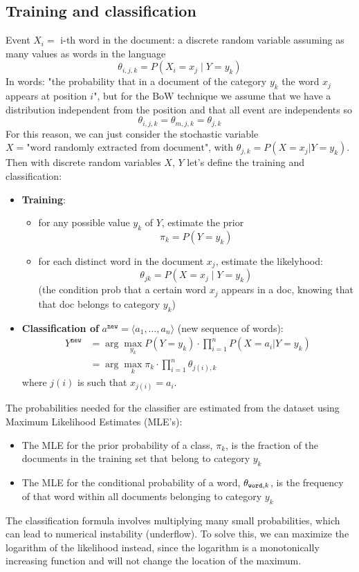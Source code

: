 \subsection{Training and classification}
Event $X_i=$ i-th word in the document: a discrete random variable assuming as many values as words in the language
\[
    \theta_{i,j,k} = P(X_i = x_j \mid Y = y_k)
\]
In words: "the probability that in a document of the category $y_k$ the word
$ x_j $ appears at position $i$", but for the BoW technique we assume that we have a distribution independent from the position and that all event are independents so 
\[
  \theta_{i,j,k} =  \theta_{m,j,k}= \theta_{j,k}
\]
For this reason, we can just consider the stochastic variable $ X = \text{"word randomly extracted from document"} $, with $ \theta_{j, k} = P(X = x_j | Y = y_k) $.
Then with discrete random variables $X$, $Y$ let's define the training and classification:
\begin{itemize}
    \item \textbf{Training}: 
    \begin{itemize}
      \item for any possible value $y_k$ of $Y$, estimate the prior
        \[
            \pi_k=P(Y=y_k)
        \]
      \item for each distinct word in the document $ x_j $, estimate the likelyhood:
        \[
            \theta_{jk} = P(X = x_j \mid Y = y_k )
        \]
        (the condition prob that a certain word $x_j$ appears in a doc, knowing that that doc belongs to category $y_k$)
    \end{itemize}
    \item \textbf{Classification of} $a^{\texttt{new}} = \langle a_1,\dots,a_n \rangle$ (new sequence of words):
    \begin{align*}
        Y^{\texttt{new}} &=\arg\max_{y_k} P(Y = y_k) \cdot \prod_{i=1}^n P(X = a_i | Y = y_k)\\
        &= \arg\max_{k}\pi_k\cdot \prod_{i=1}^{n}\theta_{j(i),k}
    \end{align*}
    where $j(i)$ is such that $ x_{j(i)} = a_i $.
\end{itemize} 

The probabilities needed for the classifier are estimated from the dataset using Maximum Likelihood Estimates (MLE's):
\begin{itemize}
    \item The MLE for the prior probability of a class, $\pi_k$, is the fraction of the documents in the training set that belong to category $y_k$
    \item The MLE for the conditional probability of a word, $\theta_{\text{\texttt{word}},k}$, is the frequency of that word within all documents belonging to category $y_k$
\end{itemize}
The classification formula involves multiplying many small probabilities, which can lead to numerical instability (underflow). To solve this, we can maximize the logarithm of the likelihood instead, since the logarithm is a monotonically increasing function and will not change the location of the maximum.

